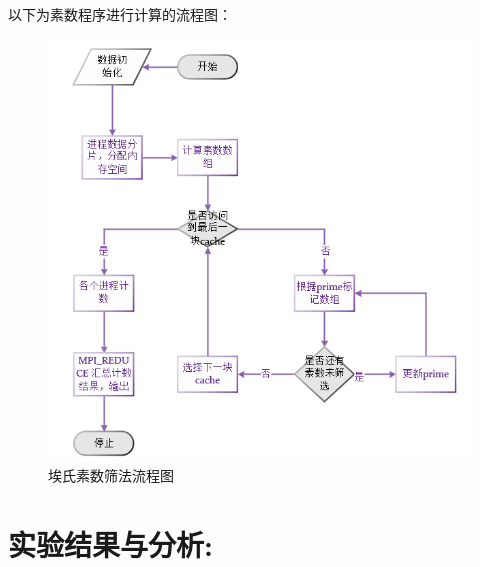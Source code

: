 \documentclass[a4paper,11pt,UTF8]{ctexart}
\begin{document}
以下为素数程序进行计算的流程图：
\begin {figure}[h]
\centering %
\includegraphics[width=\textwidth]{0242-041323.png}
\caption{埃氏素数筛法流程图} %
\label{five}
\end {figure}


\section{实验结果与分析:}
\end{document}

